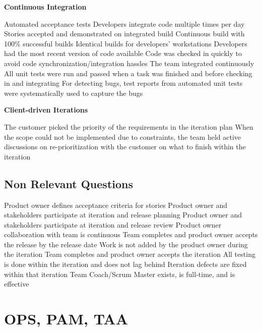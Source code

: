 \begin{appendices}
\textbf{Continuous Integration}
\begin{itemize}
	\taa Automated acceptance tests
	\taar Developers integrate code multiple times per day
	\taar Stories accepted and demonstrated on integrated build
	\taar Continuous build with 100\% successful builds
	\taar Identical builds for developers' workstations %
	\pam Developers had the most recent version of code available
	\pam Code was checked in quickly to avoid code synchronization/integration hassles
	\pamr The team integrated continuously
	\pamr All unit tests were run and passed when a task was finished and before checking in and integrating
	\pamr For detecting bugs, test reports from automated unit tests were systematically used to capture the bugs
\end{itemize}

\textbf{Client-driven Iterations}
\begin{itemize}
	\pam The customer picked the priority of the requirements in the iteration plan
	\pamr When the scope could not be implemented due to constraints, the team held active discussions on re-prioritization with the customer on what to finish within the iteration 
\end{itemize}

\section{Non Relevant Questions}

\begin{itemize}
	\taanr Product owner defines acceptance criteria for stories 
	\taanr Product owner and stakeholders participate at iteration and release planning 
	\taanr Product owner and stakeholders participate at iteration and release review 
	\taanr Product owner collaboration with team is continuous  
	\taanr Team completes and product owner accepts the release by the release date	 
	\taanr Work is not added by the product owner during the iteration 
	\taanr Team completes and product owner accepts the iteration  	 
	\taanr All testing is done within the iteration and does not lag behind 
	\taanr Iteration defects are fixed within that iteration 
	\taanr Team Coach/Scrum Master exists, is full-time, and is effective
\end{itemize}


\chapter{OPS, PAM, TAA}


\end{appendices}
